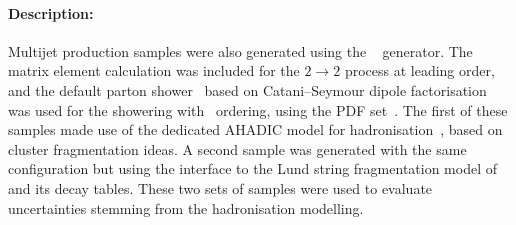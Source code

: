 \paragraph{Description:}

Multijet production samples were also generated using the \SHERPA[2.2.5]~\cite{Bothmann:2019yzt} generator. 
The matrix element calculation was included for the $2\rightarrow2$ process at leading order, and the default \SHERPA parton
shower~\cite{Schumann:2007mg} based on Catani--Seymour dipole factorisation was used for the showering with \pt\
ordering, using the \CT[14nnlo] PDF set~\cite{Dulat:2015mca}.
The first of these samples made use of the dedicated \SHERPA AHADIC model for hadronisation~\cite{Winter:2003tt}, 
based on cluster fragmentation ideas. A second sample was generated with the same configuration but using the \SHERPA interface to
the Lund string fragmentation model of \PYTHIA[6]~\cite{Sjostrand:2006za} and its decay tables.  
These two sets of samples were used to evaluate uncertainties stemming from the hadronisation modelling. 

